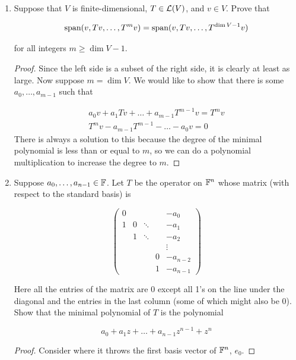 \begin{enumerate}
\begin{proof}
        Wow quite a mess.
    \end{proof}

    \item[10] Suppose that $V$ is finite-dimensional, $T \in \mathcal L(V)$, and $v \in V$. Prove that 
    
    $$\text{span}(v, Tv, \dots, T^mv) = \text{span}(v, Tv, \dots, T^{\dim V - 1}v)$$

    for all integers $m \ge \dim V - 1$.

    \begin{proof}
        Since the left side is a subset of the right side, it is clearly at least as large. Now suppose $m =\dim V$. We would like to show that there is some $a_0, \dots, a_{m-1}$ such that 

        \begin{align*}
            a_0v + a_1Tv + \dots + a_{m-1}T^{m-1}v = T^{m}v \\
            T^{m}v - a_{m-1}T^{m-1} - \dots - a_0v = 0
        \end{align*}
        There is always a solution to this because the degree of the minimal polynomial is less than or equal to $m$, so we can do a polynomial multiplication to increase the degree to $m$.
    \end{proof}

    \item[16] Suppose $a_0, \dots, a_{n-1} \in \mathbb{F}$. Let $T$ be the operator on $\mathbb{F}^n$ whose matrix (with respect to the standard basis) is 
    
    $$\begin{pmatrix}
        0 & & & & -a_0 \\
        1 & 0 & \ddots & & -a_1 \\
          & 1 & \ddots & & -a_2 \\
          &   &  & & \vdots \\
          &   &        & 0 & -a_{n - 2} \\
          &   &        & 1 & -a_{n - 1}
    \end{pmatrix}$$

    Here all the entries of the matrix are 0 except all 1's on the line under the diagonal and the entries in the last column (some of which might also be 0). Show that the minimal polynomial of $T$ is the polynomial

    $$a_0 + a_1z + \dots + a_{n-1}z^{n-1} + z^n$$

    \begin{proof}
        Consider where it throws the first basis vector of $\mathbb{F}^n$, $e_0$.


\end{proof}
\end{enumerate}
